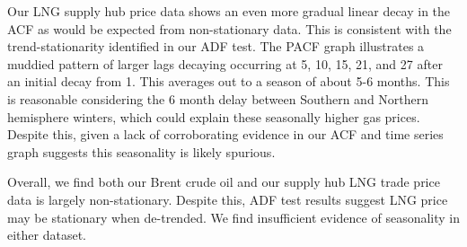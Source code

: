 Our LNG supply hub price data shows an even more gradual linear decay in the ACF as would be expected from non-stationary data. This is consistent with the trend-stationarity identified in our ADF test. The PACF graph illustrates a muddied pattern of larger lags decaying occurring at 5, 10, 15, 21, and 27 after an initial decay from 1. This averages out to a season of about 5-6 months. This is reasonable considering the 6 month delay between Southern and Northern hemisphere winters, which could explain these seasonally higher gas prices. Despite this, given a lack of corroborating evidence in our ACF and time series graph suggests this seasonality is likely spurious.
\medskip

Overall, we find both our Brent crude oil and our supply hub LNG trade price data is largely non-stationary. Despite this, ADF test results suggest LNG price may be stationary when de-trended. We find insufficient evidence of seasonality in either dataset.